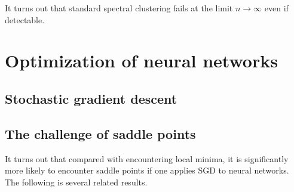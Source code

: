 \documentclass{article}
\begin{document}
It turns out that standard spectral clustering fails at the limit $n \rightarrow \infty$ even if detectable.


\section{Optimization of neural networks}

\subsection{Stochastic gradient descent}

\subsection{The challenge of saddle points}

It turns out that compared with encountering local minima, it is significantly more likely to encounter saddle points if one applies SGD to neural networks.
The following is several related results.



\end{document}
